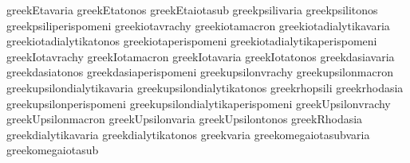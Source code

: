  greekEtavaria                       {}
 greekEtatonos                       {}
 greekEtaiotasub                     {}
 greekpsilivaria                     {}
 greekpsilitonos                     {}
 greekpsiliperispomeni               {}
 greekiotavrachy                     {} %
 greekiotamacron                     {}
 greekiotadialytikavaria             {}
 greekiotadialytikatonos             {}
 greekiotaperispomeni                {}
 greekiotadialytikaperispomeni       {}
 greekIotavrachy                     {}
 greekIotamacron                     {}
 greekIotavaria                      {}
 greekIotatonos                      {}
 greekdasiavaria                     {}
 greekdasiatonos                     {}
 greekdasiaperispomeni               {}
 greekupsilonvrachy                  {} %
 greekupsilonmacron                  {}
 greekupsilondialytikavaria          {}
 greekupsilondialytikatonos          {}
 greekrhopsili                       {}
 greekrhodasia                       {}
 greekupsilonperispomeni             {}
 greekupsilondialytikaperispomeni    {}
 greekUpsilonvrachy                  {}
 greekUpsilonmacron                  {}
 greekUpsilonvaria                   {}
 greekUpsilontonos                   {}
 greekRhodasia                       {}
 greekdialytikavaria                 {}
 greekdialytikatonos                 {}
 greekvaria                          {}
 greekomegaiotasubvaria              {}
 greekomegaiotasub                   {}
